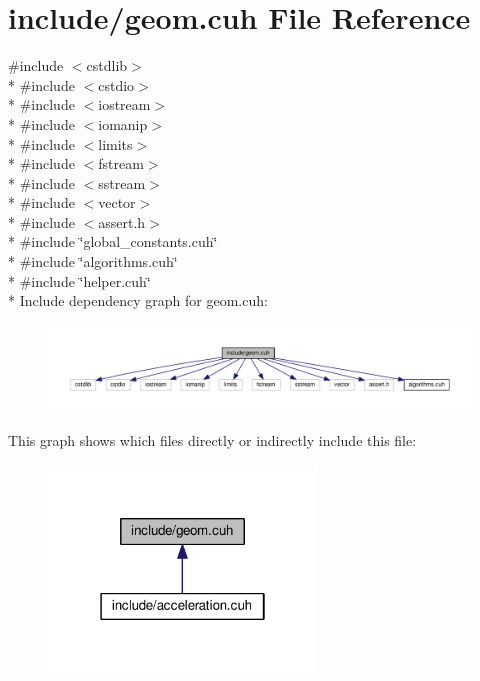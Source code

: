 \hypertarget{cuda_tracer__0__1_2include_2geom_8cuh}{}\section{include/geom.cuh File Reference}
\label{cuda_tracer__0__1_2include_2geom_8cuh}
{\ttfamily \#include $<$cstdlib$>$}\\*
{\ttfamily \#include $<$cstdio$>$}\\*
{\ttfamily \#include $<$iostream$>$}\\*
{\ttfamily \#include $<$iomanip$>$}\\*
{\ttfamily \#include $<$limits$>$}\\*
{\ttfamily \#include $<$fstream$>$}\\*
{\ttfamily \#include $<$sstream$>$}\\*
{\ttfamily \#include $<$vector$>$}\\*
{\ttfamily \#include $<$assert.\+h$>$}\\*
{\ttfamily \#include \char`\"{}global\+\_\+constants.\+cuh\char`\"{}}\\*
{\ttfamily \#include \char`\"{}algorithms.\+cuh\char`\"{}}\\*
{\ttfamily \#include \char`\"{}helper.\+cuh\char`\"{}}\\*
Include dependency graph for geom.\+cuh\+:
\nopagebreak
\begin{figure}[H]
\begin{center}
\leavevmode
\includegraphics[width=350pt]{cuda_tracer__0__1_2include_2geom_8cuh__incl}
\end{center}
\end{figure}
This graph shows which files directly or indirectly include this file\+:
\nopagebreak
\begin{figure}[H]
\begin{center}
\leavevmode
\includegraphics[width=202pt]{cuda_tracer__0__1_2include_2geom_8cuh__dep__incl}
\end{center}
\end{figure}
